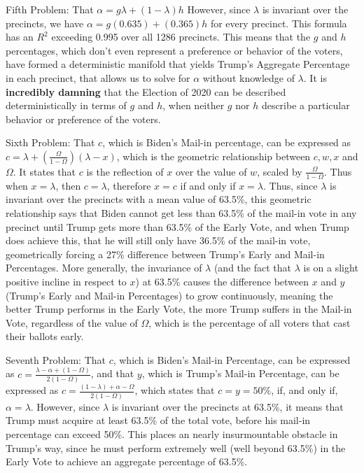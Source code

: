 \documentclass[preprint,13pt]{elsarticle}
\begin{document}
Fifth Problem: That $\alpha=g\lambda+(1-\lambda)h$   However, since $\lambda$ is invariant over the precincts, we have $\alpha=g(0.635)+(0.365)h$ for every precinct. This formula has an $R^2$ exceeding 0.995 over all 1286 precincts.  This means that the $g$ and $h$ percentages, which don't even represent a preference or behavior of the voters, have formed a deterministic manifold that yields Trump's Aggregate Percentage in each precinct, that allows us to solve for $\alpha$ without knowledge of $\lambda$. It is \textbf{incredibly damning} that the Election of 2020  can be described deterministically in terms of $g$ and $h$, when neither $g$ nor $h$ describe a particular behavior or preference of the voters.

Sixth Problem: That $c$, which is Biden's Mail-in percentage, can be expressed as $c=\lambda+(\frac{\Omega}{1-\Omega})(\lambda-x)$, which is the geometric relationship between $c,w,x$ and $\Omega$. It states that $c$ is the reflection of $x$ over the value of $w$, scaled by $\frac{\Omega}{1-\Omega}$. Thus when $x=\lambda$, then $c=\lambda$, therefore $x=c$ if and only if $x=\lambda$. Thus, since $\lambda$ is invariant over the precincts with a mean value of 63.5\%, this geometric relationship says that Biden cannot get less than 63.5\% of the mail-in vote in any precinct until Trump gets more than 63.5\% of the Early Vote, and when Trump does achieve this, that he will still only have 36.5\% of the mail-in vote, geometrically forcing a 27\% difference between Trump's Early and Mail-in Percentages.  More generally, the invariance of $\lambda$ (and the fact that $\lambda$ is on a slight positive incline in respect to $x$) at 63.5\% causes the difference between $x$ and $y$ (Trump's Early and Mail-in Percentages) to grow continuously, meaning the better Trump performs in the Early Vote, the more Trump suffers in the Mail-in Vote, regardless of the value of $\Omega$, which is the percentage of all voters that cast their ballots early.

Seventh Problem: That $c$, which is Biden's Mail-in Percentage, can be expressed as $c=\frac{\lambda-\alpha+(1-\Omega)}{2(1-\Omega)}$, and that $y$, which is Trump's Mail-in Percentage, can be expressed as $c=\frac{(1-\lambda)+\alpha-\Omega}{2(1-\Omega)}$, which states that $c=y=50\%$, if, and only if, $\alpha=\lambda$.  However, since $\lambda$ is invariant over the precincts at 63.5\%, it means that Trump must acquire at least 63.5\% of the total vote, before his mail-in percentage can exceed 50\%. This places an nearly insurmountable obstacle in Trump's way, since he must perform extremely well (well beyond 63.5\%) in the Early Vote to achieve an aggregate percentage of 63.5\%.
\end{document}
